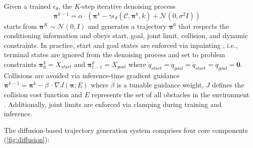 Given a trained $\epsilon_\theta$, the $K$-step iterative denoising process
\begin{equation}
    \bm{\pi}^{k-1} = \alpha \cdot (\bm{\pi}^k - \gamma\epsilon_\theta(\mathcal{C}, \bm{\pi}^k, k) + \mathcal{N}(0, \sigma^2I))
\end{equation}
starts from $\bm{\pi}^K \sim \mathcal{N}(0, I)$ and generates a trajectory $\bm{\pi}^0$ that respects the conditioning information and obeys start, goal, joint limit, collision, and dynamic constraints.
In practice, start and goal states are enforced via inpainting \cite{carvalho2023motion}, i.e., terminal states are ignored from the denoising process and set to problem constraints $\bm{\pi}_0^k = X_{start}$ and $\bm{\pi}_{t-1}^k = X_{goal}$ where $\dot{q}_{start} = \dot{q}_{goal} = \ddot{q}_{start} = \ddot{q}_{goal} = \bm{0}$.
Collisions are avoided via inference-time gradient guidance $\bm{\pi}^{k-1} = \bm{\pi}^k - \beta\ \cdot \nabla J(\bm{\pi}; E)$ where $\beta$ is a tunable guidance weight, $J$ defines the collision cost function and $E$ represents the set of all obstacles in the environment \cite{saha2024edmp}.
Additionally, joint limits are enforced via clamping during training and inference.


The diffusion-based trajectory generation system comprises four core components (\cref{fig:diffusion}):

